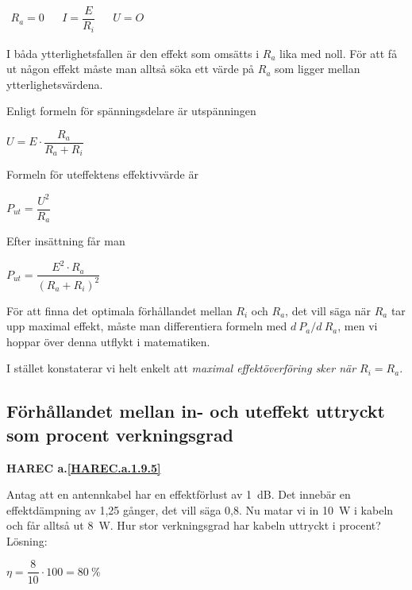 \(
\begin{array}{lllll}
R_a = 0 & & I = \dfrac{E}{R_i} & & U = O
\end{array}
\)

I båda ytterlighetsfallen är den effekt som omsätts i \(R_a\) lika med noll.
För att få ut någon effekt måste man alltså söka ett värde på \(R_a\) som
ligger mellan ytterlighetsvärdena.

Enligt formeln för spänningsdelare är utspänningen

\(U = E \cdot \dfrac{R_a}{R_a+R_i}\)

Formeln för uteffektens effektivvärde är

\(P_{ut} = \dfrac{U^2}{R_a}\)

Efter insättning får man

\(P_{ut} = \dfrac{E^2 \cdot R_a}{(R_a + R_i)^2}\)

För att finna det optimala förhållandet mellan \(R_i\) och \(R_a\), det vill
säga när \(R_a\) tar upp maximal effekt, måste man differentiera formeln med
\(d\ P_a/d\ R_a\), men vi hoppar över denna utflykt i matematiken.

I stället konstaterar vi helt enkelt att \emph{maximal effektöverföring sker när
\(R_i = R_a\)}.

\subsection{Förhållandet mellan in- och uteffekt uttryckt som procent verkningsgrad}
\textbf{HAREC a.\ref{HAREC.a.1.9.5}\label{myHAREC.a.1.9.5}}

Antag att en antennkabel har en effektförlust av 1~dB.
Det innebär en effektdämpning av 1,25 gånger, det vill säga 0,8.
Nu matar vi in 10~W i kabeln och får alltså ut 8~W.
Hur stor verkningsgrad har kabeln uttryckt i procent?
Lösning:

\(\eta = \dfrac{8}{10} \cdot 100 = 80\ \%\)
